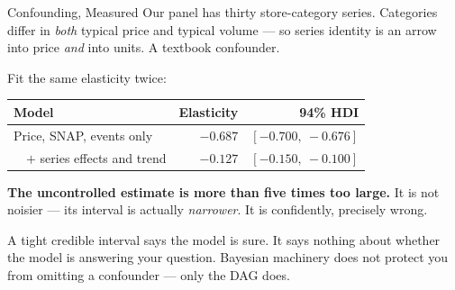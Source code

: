 \documentclass[aspectratio=169, 11pt]{beamer}
\begin{document}
\begin{frame}{Confounding, Measured}
  Our panel has thirty store-category series. Categories differ in \emph{both} typical price and
  typical volume --- so series identity is an arrow into price \emph{and} into units. A textbook
  confounder.

  \vspace{0.1cm}
  Fit the same elasticity twice:
  \begin{center}
    {\small
    \begin{tabular}{lrr}
      \toprule
      \textbf{Model} & \textbf{Elasticity} & \textbf{94\% HDI} \\
      \midrule
      Price, SNAP, events only & $-0.687$ & $[-0.700,\ -0.676]$ \\
      \ \ $+$ series effects and trend & $\mathbf{-0.127}$ & $[-0.150,\ -0.100]$ \\
      \bottomrule
    \end{tabular}
    }
  \end{center}

  \vspace{-0.05cm}
  \textbf{The uncontrolled estimate is more than five times too large.} It is not noisier --- its
  interval is actually \emph{narrower}. It is confidently, precisely wrong.

  \begin{warningbox}
    A tight credible interval says the model is sure. It says nothing about whether the model is
    answering your question. Bayesian machinery does not protect you from omitting a confounder
    --- only the DAG does.
  \end{warningbox}
\end{frame}
\end{document}
